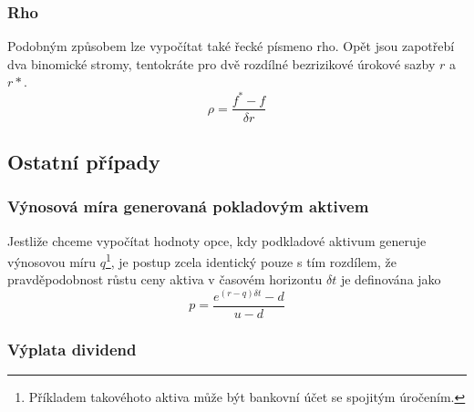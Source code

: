 \documentclass[a4paper]{book}
\begin{document}
\subsubsection{Rho}

Podobným způsobem lze vypočítat také řecké písmeno rho. Opět jsou zapotřebí dva binomické stromy, tentokráte pro dvě rozdílné bezrizikové úrokové sazby $r$ a $r*$.
\begin{equation*}
\rho = \frac{f^* - f}{\delta r}
\end{equation*}

\subsection{Ostatní případy}

\subsubsection{Výnosová míra generovaná pokladovým aktivem}

Jestliže chceme vypočítat hodnoty opce, kdy podkladové aktivum generuje výnosovou míru $q$\footnote{Příkladem takovéhoto aktiva může být bankovní účet se spojitým úročením.}, je postup zcela identický pouze s tím rozdílem, že pravděpodobnost růstu ceny aktiva v časovém horizontu $\delta t$ je definována jako
\begin{equation*}
p = \frac{e^{(r-q)\delta t}-d}{u-d}
\end{equation*}

\subsubsection{Výplata dividend}
\end{document}
